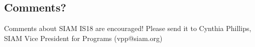\begin{multicols}{2}
\subsection*{Comments?}
Comments about SIAM IS18 are encouraged! Please send it to Cynthia Phillips, SIAM Vice President for Programs (vpp@siam.org)
\end{multicols}
